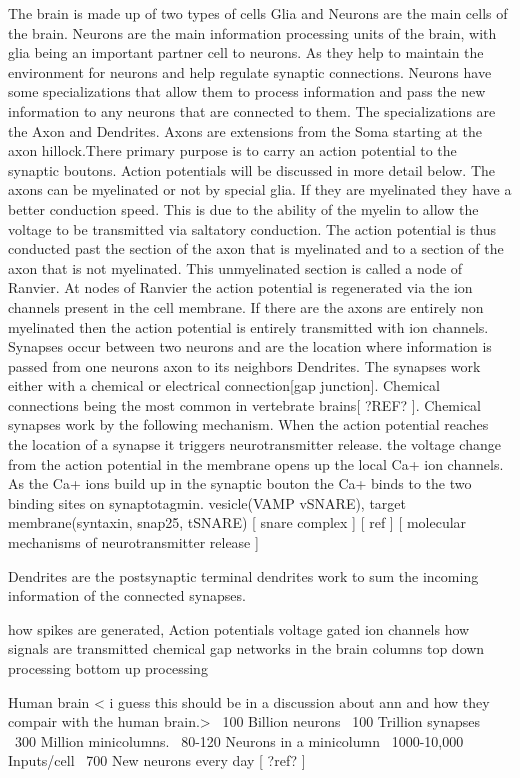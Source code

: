 The brain is made up of two types of cells Glia and Neurons are the main cells of the brain. Neurons are the main information processing units of the brain, with glia being an important partner cell to neurons. As they help to maintain the environment for neurons and help regulate synaptic connections. Neurons have some specializations that allow them to process information and pass the new information to any neurons that are connected to them. The specializations are the Axon and Dendrites. Axons are extensions from the Soma starting at the axon hillock.There primary purpose is to carry an action potential to the synaptic boutons. Action potentials will be discussed in more detail below. The axons can be myelinated or not by special glia. If they are myelinated they have a better conduction speed. This is due to the ability of the myelin to allow the voltage to be transmitted via saltatory conduction. The action potential is thus conducted past the section of the axon that is myelinated and to a section of the axon that is not myelinated. This unmyelinated section is called a node of Ranvier. At nodes of Ranvier the action potential is regenerated via the ion channels present in the cell membrane. If there are the axons are entirely non myelinated then the action potential is entirely transmitted with ion channels. 
Synapses occur between two neurons and are the location where information is passed from one neurons axon to its neighbors Dendrites. The synapses work either with a chemical or electrical connection[gap junction]. Chemical connections being the most common in vertebrate brains[ ?REF? ]. Chemical synapses work by the following mechanism. When the action potential reaches the location of a synapse it triggers neurotransmitter release. the voltage change from the action potential in the membrane opens up the local Ca+ ion channels. As the Ca+ ions build up in the synaptic bouton the Ca+ binds to the two binding sites on synaptotagmin.  vesicle(VAMP vSNARE), target membrane(syntaxin, snap25, tSNARE) [ snare complex ]
[ ref ] [ molecular mechanisms of neurotransmitter release ]

Dendrites are 
     the postsynaptic terminal 
    dendrites work to sum the incoming information of the connected synapses.
    
how spikes are generated, 
    Action potentials
        voltage gated ion channels
how signals are transmitted 
    chemical 
    gap 
networks in the brain 
    columns
top down processing 
bottom up processing


Human brain < i guess this should be in a discussion about ann and how they compair with the human brain.>
~100 Billion neurons
~100 Trillion synapses
~300 Million minicolumns.
~80-120 Neurons in a minicolumn
~1000-10,000 Inputs/cell
~700 New neurons every day [ ?ref? ]


